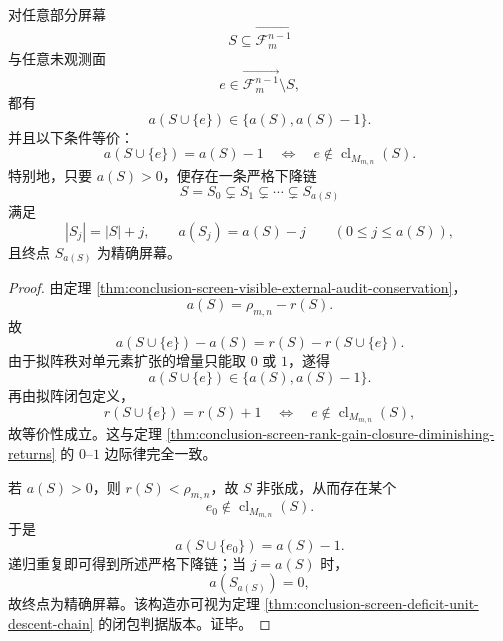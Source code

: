 \begin{theorem}[单面增广的闭包判据与严格缺口阶梯]\label{thm:conclusion-screen-single-face-closure-entropy-staircase}
对任意部分屏幕
\[
S\subseteq \overrightarrow{\mathcal F_m^{n-1}}
\]
与任意未观测面
\[
e\in \overrightarrow{\mathcal F_m^{n-1}}\setminus S,
\]
都有
\[
a(S\cup\{e\})\in \{a(S),a(S)-1\}.
\]
并且以下条件等价：
\[
a(S\cup\{e\})=a(S)-1
\quad\Longleftrightarrow\quad
e\notin \operatorname{cl}_{M_{m,n}}(S).
\]
特别地，只要 \(a(S)>0\)，便存在一条严格下降链
\[
S=S_0\subsetneq S_1\subsetneq \cdots \subsetneq S_{a(S)}
\]
满足
\[
|S_j|=|S|+j,
\qquad
a(S_j)=a(S)-j
\qquad
(0\le j\le a(S)),
\]
且终点 \(S_{a(S)}\) 为精确屏幕。
\end{theorem}
\begin{proof}
由定理 \ref{thm:conclusion-screen-visible-external-audit-conservation}，
\[
a(S)=\rho_{m,n}-r(S).
\]
故
\[
a(S\cup\{e\})-a(S)=r(S)-r(S\cup\{e\}).
\]
由于拟阵秩对单元素扩张的增量只能取 \(0\) 或 \(1\)，遂得
\[
a(S\cup\{e\})\in \{a(S),a(S)-1\}.
\]
再由拟阵闭包定义，
\[
r(S\cup\{e\})=r(S)+1
\quad\Longleftrightarrow\quad
e\notin \operatorname{cl}_{M_{m,n}}(S),
\]
故等价性成立。这与定理 \ref{thm:conclusion-screen-rank-gain-closure-diminishing-returns} 的 \(0\text{--}1\) 边际律完全一致。

若 \(a(S)>0\)，则 \(r(S)<\rho_{m,n}\)，故 \(S\) 非张成，从而存在某个
\[
e_0\notin \operatorname{cl}_{M_{m,n}}(S).
\]
于是
\[
a(S\cup\{e_0\})=a(S)-1.
\]
递归重复即可得到所述严格下降链；当 \(j=a(S)\) 时，
\[
a(S_{a(S)})=0,
\]
故终点为精确屏幕。该构造亦可视为定理 \ref{thm:conclusion-screen-deficit-unit-descent-chain} 的闭包判据版本。证毕。
\end{proof}

